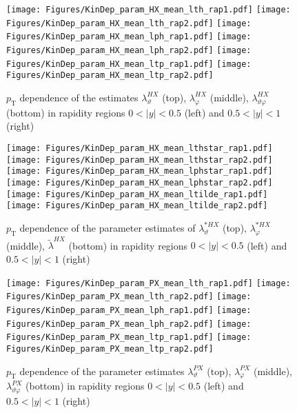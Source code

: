\documentclass[12pt]{article}
\newcommand{\pT}{p_\mathrm{T}}
\newcommand{\absy}{\left |  y \right |}
\newcommand{\lamthHX}{\lambda^{\scriptscriptstyle HX}_\vartheta}
\newcommand{\lamphHX}{\lambda^{\scriptscriptstyle HX}_\varphi}
\newcommand{\lamthphHX}{\lambda^{\scriptscriptstyle HX}_{\vartheta \varphi}}
\newcommand{\lamtildeHX}{\tilde{\lambda}^{\scriptscriptstyle HX}}
\newcommand{\lamthstarHX}{\lambda^{* \scriptscriptstyle HX}_\vartheta}
\newcommand{\lamphstarHX}{\lambda^{* \scriptscriptstyle HX}_\varphi}
\newcommand{\lamthPX}{\lambda^{\scriptscriptstyle PX}_\vartheta}
\newcommand{\lamphPX}{\lambda^{\scriptscriptstyle PX}_\varphi}
\newcommand{\lamthphPX}{\lambda^{\scriptscriptstyle PX}_{\vartheta \varphi}}
\begin{document}



\begin{figure}[htbp]
\centering
\texttt{[image: Figures/KinDep\_param\_HX\_mean\_lth\_rap1.pdf]}
\texttt{[image: Figures/KinDep\_param\_HX\_mean\_lth\_rap2.pdf]}
\texttt{[image: Figures/KinDep\_param\_HX\_mean\_lph\_rap1.pdf]}
\texttt{[image: Figures/KinDep\_param\_HX\_mean\_lph\_rap2.pdf]}
\texttt{[image: Figures/KinDep\_param\_HX\_mean\_ltp\_rap1.pdf]}
\texttt{[image: Figures/KinDep\_param\_HX\_mean\_ltp\_rap2.pdf]}
\caption{$\pT$ dependence of the estimates $\lamthHX$ (top), $\lamphHX$ (middle), $\lamthphHX$ (bottom) in rapidity regions $0<\absy<0.5$ (left) and $0.5<\absy<1$ (right)}
\end{figure}
\clearpage

\begin{figure}[htbp]
\centering
\texttt{[image: Figures/KinDep\_param\_HX\_mean\_lthstar\_rap1.pdf]}
\texttt{[image: Figures/KinDep\_param\_HX\_mean\_lthstar\_rap2.pdf]}
\texttt{[image: Figures/KinDep\_param\_HX\_mean\_lphstar\_rap1.pdf]}
\texttt{[image: Figures/KinDep\_param\_HX\_mean\_lphstar\_rap2.pdf]}
\texttt{[image: Figures/KinDep\_param\_HX\_mean\_ltilde\_rap1.pdf]}
\texttt{[image: Figures/KinDep\_param\_HX\_mean\_ltilde\_rap2.pdf]}
\caption{$\pT$ dependence of the parameter estimates of $\lamthstarHX$ (top), $\lamphstarHX$ (middle), $\lamtildeHX$ (bottom) in rapidity regions $0<\absy<0.5$ (left) and $0.5<\absy<1$ (right)}
\end{figure}
\clearpage









\begin{figure}[htbp]
\centering
\texttt{[image: Figures/KinDep\_param\_PX\_mean\_lth\_rap1.pdf]}
\texttt{[image: Figures/KinDep\_param\_PX\_mean\_lth\_rap2.pdf]}
\texttt{[image: Figures/KinDep\_param\_PX\_mean\_lph\_rap1.pdf]}
\texttt{[image: Figures/KinDep\_param\_PX\_mean\_lph\_rap2.pdf]}
\texttt{[image: Figures/KinDep\_param\_PX\_mean\_ltp\_rap1.pdf]}
\texttt{[image: Figures/KinDep\_param\_PX\_mean\_ltp\_rap2.pdf]}
\caption{$\pT$ dependence of the parameter estimates $\lamthPX$ (top), $\lamphPX$ (middle), $\lamthphPX$ (bottom) in rapidity regions $0<\absy<0.5$ (left) and $0.5<\absy<1$ (right)}
\end{figure}
\clearpage
\end{document}
